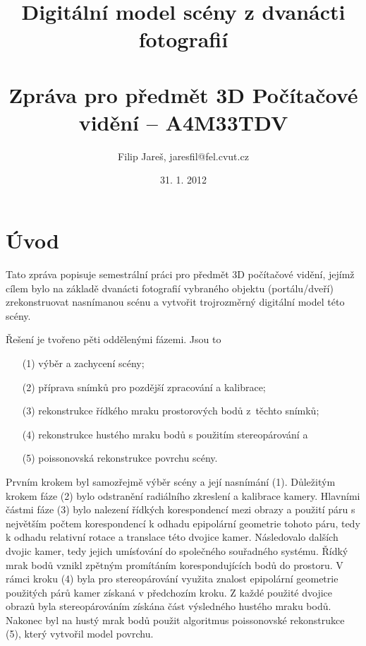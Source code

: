 \documentclass[11pt,oneside,a4paper,pdftex]{article}   %
\title{Digitální model scény z dvanácti fotografií \\ \ \\ \large Zpráva pro předmět 3D Počítačové vidění -- A4M33TDV}
\date{31. 1. 2012}
\author{Filip Jareš, jaresfil@fel.cvut.cz}
\begin{document}
\maketitle


\section*{Úvod}

	Tato zpráva popisuje semestrální práci pro předmět 3D počítačové vidění, jejímž cílem bylo na základě
	dvanácti fotografií vybraného objektu (portálu/dveří) zrekonstruovat nasnímanou scénu a vytvořit
	trojrozměrný digitální model této scény.
	
	Řešení je tvořeno pěti oddělenými fázemi. Jsou to
	\begin{enumerate}
		\item[(1)] výběr a zachycení scény;
		\item[(2)] příprava snímků pro pozdější zpracování a kalibrace;
		\item[(3)] rekonstrukce řídkého mraku prostorových bodů z~těchto snímků;
		\item[(4)] rekonstrukce hustého mraku bodů s použitím stereopárování a
		\item[(5)] poissonovská rekonstrukce povrchu scény.
	\end{enumerate}
	
	Prvním krokem byl samozřejmě výběr scény a její nasnímání (1).  Důležitým krokem fáze (2) bylo
	odstranění radiálního zkreslení a kalibrace kamery. Hlavními částmi fáze (3) bylo nalezení řídkých
	korespondencí mezi obrazy a použití páru s největším počtem korespondencí k odhadu epipolární
	geometrie tohoto páru, tedy k odhadu relativní rotace a translace této dvojice kamer.  Následovalo
	 dalších dvojic kamer, tedy jejich umísťování do společného souřadného systému. Řídký
	mrak bodů vznikl zpětným promítáním korespondujících bodů do prostoru. V rámci kroku (4) byla pro
	stereopárování využita znalost epipolární geometrie použitých párů kamer získaná v předchozím
	kroku.  Z každé použité dvojice obrazů byla stereopárováním získána část výsledného hustého mraku
	bodů.  Nakonec byl na hustý mrak bodů použit algoritmus poissonovské rekonstrukce (5), který vytvořil
	model povrchu.
	
\end{document}
